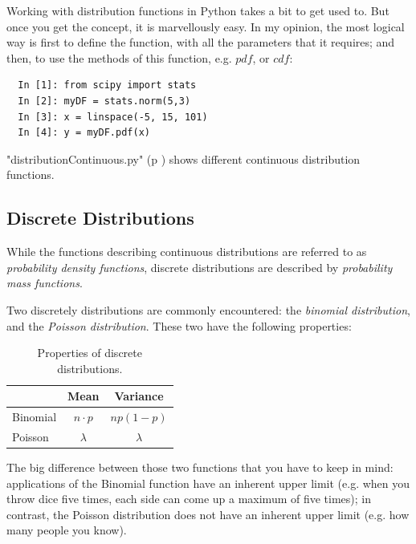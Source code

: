Working with distribution functions in Python takes a bit to get used to. But once you get the concept, it is marvellously easy. In my opinion, the most logical way is first to define the function, with all the parameters that it requires; and then, to use the methods of this function, e.g. $pdf$, or $cdf$:

\begin{lstlisting}
  In [1]: from scipy import stats
  In [2]: myDF = stats.norm(5,3)
  In [3]: x = linspace(-5, 15, 101)
  In [4]: y = myDF.pdf(x)
\end{lstlisting}

\PyImg "distributionContinuous.py" (p \pageref{py:continuous}) shows different continuous distribution functions.

\subsection{Discrete Distributions}

While the functions describing continuous distributions are referred to as \emph{probability density functions}, discrete distributions are described by \emph{probability mass functions}.

Two discretely distributions are commonly encountered: the \emph{binomial distribution}, and the \emph{Poisson distribution}. These two have the following properties:

\begin{table}[h]
  \centering
  \begin{tabular}{l|c|c|}
      & Mean & Variance \\
      \hline
      Binomial & $n \cdot p$ & $np(1-p)$ \\
      Poisson & $\lambda$ & $\lambda$ \\
  \end{tabular}
\caption{Properties of discrete distributions.}
\end{table}

The big difference between those two functions that you have to keep in mind: applications of the Binomial function have an inherent upper limit (e.g. when you throw dice five times, each side can come up a maximum of five times); in contrast, the Poisson distribution does not have an inherent upper limit (e.g. how many people you know).

